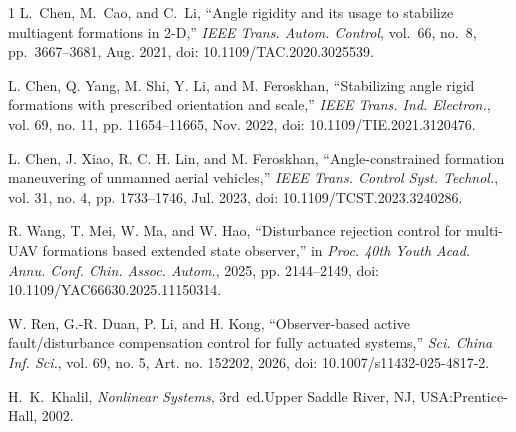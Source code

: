 \documentclass[letterpaper,journal]{IEEEtran}
\theoremstyle{plain}
\theoremstyle{definition}
\theoremstyle{remark}
\begin{document}
\begin{thebibliography}{1}
L.~Chen, M.~Cao, and C.~Li, ``Angle rigidity and its usage to stabilize multiagent formations in 2-D,'' \textit{IEEE Trans. Autom. Control}, vol.~66, no.~8, pp.~3667--3681, Aug. 2021, doi: 10.1109/TAC.2020.3025539.

L. Chen, Q. Yang, M. Shi, Y. Li, and M. Feroskhan, ``Stabilizing angle rigid formations with prescribed orientation and scale,'' \textit{IEEE Trans. Ind. Electron.}, vol. 69, no. 11, pp. 11654--11665, Nov. 2022, doi: 10.1109/TIE.2021.3120476.

L. Chen, J. Xiao, R. C. H. Lin, and M. Feroskhan, ``Angle-constrained formation maneuvering of unmanned aerial vehicles,'' \textit{IEEE Trans. Control Syst. Technol.}, vol. 31, no. 4, pp. 1733--1746, Jul. 2023, doi: 10.1109/TCST.2023.3240286.

R. Wang, T. Mei, W. Ma, and W. Hao, ``Disturbance rejection control for multi-UAV formations based extended state observer,'' in \textit{Proc. 40th Youth Acad. Annu. Conf. Chin. Assoc. Autom.}, 2025, pp. 2144--2149, doi: 10.1109/YAC66630.2025.11150314.

W. Ren, G.-R. Duan, P. Li, and H. Kong, ``Observer-based active fault/disturbance compensation control for fully actuated systems,'' \textit{Sci. China Inf. Sci.}, vol. 69, no. 5, Art. no. 152202, 2026, doi: 10.1007/s11432-025-4817-2.

H.~K.~Khalil, \textit{Nonlinear Systems}, 3rd~ed.\hfill Upper Saddle River, NJ, USA:\hfill Prentice-Hall, 2002.

\end{thebibliography}
\end{document}
